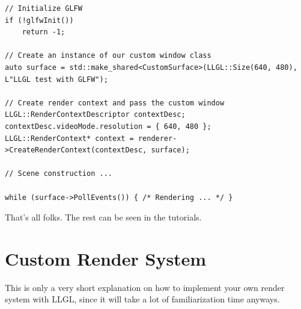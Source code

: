 \documentclass{article}
\begin{document}
\begin{lstlisting}
// Initialize GLFW
if (!glfwInit())
	return -1;

// Create an instance of our custom window class
auto surface = std::make_shared<CustomSurface>(LLGL::Size(640, 480), L"LLGL test with GLFW");

// Create render context and pass the custom window
LLGL::RenderContextDescriptor contextDesc;
contextDesc.videoMode.resolution = { 640, 480 };
LLGL::RenderContext* context = renderer->CreateRenderContext(contextDesc, surface);

// Scene construction ...

while (surface->PollEvents()) { /* Rendering ... */ }
\end{lstlisting}
That's all folks. The rest can be seen in the tutorials.



\newpage
\section{Custom Render System}
\label{sec:custom_renderer}

This is only a very short explanation on how to implement your own render system with LLGL,
since it will take a lot of familiarization time anyways.
\end{document}
